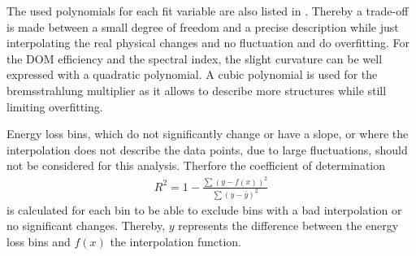 The used polynomials for each fit variable are also listed in .
Thereby a trade-off is made between a small degree of freedom and a precise description while just interpolating the real physical changes and no fluctuation and do overfitting.
For the DOM efficiency and the spectral index, the slight curvature can be well expressed with a quadratic polynomial.
A cubic polynomial is used for the bremsstrahlung multiplier as it allows to describe more structures while still limiting overfitting.

Energy loss bins, which do not significantly change or have a slope, or where the interpolation does not describe the data points, due to large fluctuations, should not be considered for this analysis.
Therfore the coefficient of determination
\begin{align}
    R^2 = 1 - \frac{\sum (y - f(x))^2}{\sum (y - \bar{y})^2}
\end{align}
is calculated for each bin to be able to exclude bins with a bad interpolation or no significant changes.
Thereby, $y$ represents the difference between the energy loss bins and $f(x)$ the interpolation function.
